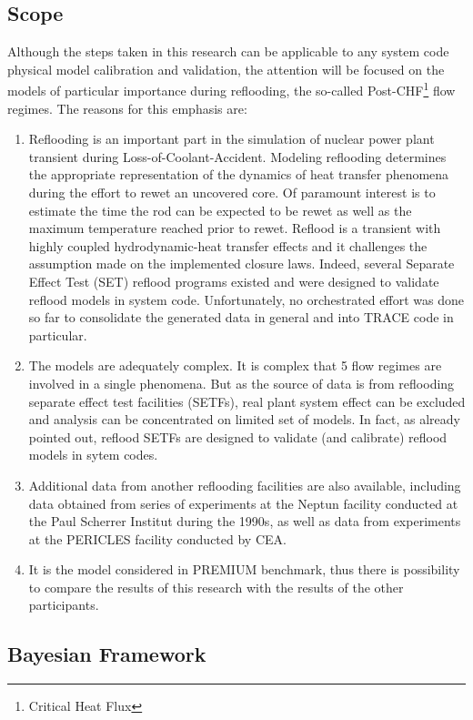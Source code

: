 \documentclass[11pt,titlepage]{article}
\begin{document}
\subsection{Scope}  

Although the steps taken in this research can be applicable to any system code physical model calibration and validation, the attention will be focused on the models of particular importance during reflooding, the so-called Post-CHF\footnote{Critical Heat Flux} flow regimes. 
The reasons for this emphasis are:
\begin{enumerate}
	\item Reflooding is an important part in the simulation of nuclear power plant transient during Loss-of-Coolant-Accident. 
	Modeling reflooding determines the appropriate representation of the dynamics of heat transfer phenomena during the effort to rewet an uncovered core. 
	Of paramount interest is to estimate the time the rod can be expected to be rewet as well as the maximum temperature reached prior to rewet. 
	Reflood is a transient with highly coupled hydrodynamic-heat transfer effects and it challenges the assumption made on the implemented closure laws. 
	Indeed, several Separate Effect Test (SET) reflood programs existed and were designed to validate reflood models in system code. 
	Unfortunately, no orchestrated effort was done so far to consolidate the generated data in general and into TRACE code in particular.
	\item The models are adequately complex. 
	It is complex that 5 flow regimes are involved in a single phenomena. 
	But as the source of data is from reflooding separate effect test facilities (SETFs), real plant system effect can be excluded and analysis can be concentrated on limited set of models.
	In fact, as already pointed out, reflood SETFs are designed to validate (and calibrate) reflood models in sytem codes.
	\item Additional data from another reflooding facilities are also available, including data obtained from series of experiments at the Neptun facility conducted at the Paul Scherrer Institut during the 1990s, as well as data from experiments at the PERICLES facility conducted by CEA.
	\item It is the model considered in PREMIUM benchmark, thus there is possibility to compare the results of this research with the results of the other participants.
\end{enumerate}

\subsection{Bayesian Framework}
\end{document}
